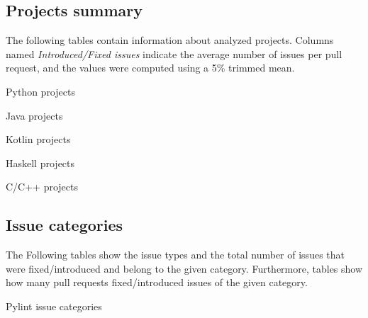 \documentclass[digital,oneside,oldtable,nolof,nolot,nocover]{fithesis4}
\begin{document}
\subsection*{Projects summary}
\label{sec:orgf698c2a}
The following tables contain information about analyzed projects. Columns named \emph{Introduced/Fixed issues} indicate
the average number of issues per pull request, and the values were computed using a 5\% trimmed mean.

\begin{table}[H]
\caption{Python projects}
\centering
\begingroup\scriptsize

\endgroup
\end{table}

\begin{table}[H]
\caption{Java projects}
\centering
\begingroup\scriptsize

\endgroup
\end{table}

\newpage
\noindent\begin{minipage}{\textwidth}
  \begin{table}[H]
  \caption{Kotlin projects}
  \centering
  \begingroup\scriptsize
  
  \endgroup
  \end{table}

  \begin{table}[H]
  \caption{Haskell projects}
  \centering
  \begingroup\scriptsize
  
  \endgroup
  \end{table}
\end{minipage}
\newpage

\begin{table}[H]
\caption{C/C++ projects}
\centering
\begingroup\scriptsize

\endgroup
\end{table}

\FloatBarrier
\subsection*{Issue categories}
\label{sec:org0fd25ef}
The Following tables show the issue types and the total number of issues that
were fixed/introduced and belong to the given category. Furthermore, tables
show how many pull requests fixed/introduced issues of the given category.
\begin{table}[H]
\caption{Pylint issue categories}
\centering
\begingroup\scriptsize

\endgroup
\end{table}
\end{document}
